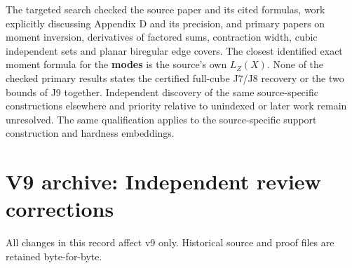 \documentclass[
  11pt,
]{article}
\begin{document}
The targeted search checked the source paper and its cited formulas,
work explicitly discussing Appendix D and its precision, and primary
papers on moment inversion, derivatives of factored sums, contraction
width, cubic independent sets and planar biregular edge covers. The
closest identified exact moment formula for the \textbf{modes} is the
source's own \(L_Z(X)\). None of the checked primary results states the
certified full-cube J7/J8 recovery or the two bounds of J9 together.
Independent discovery of the same source-specific constructions
elsewhere and priority relative to unindexed or later work remain
unresolved. The same qualification applies to the source-specific
support construction and hardness embeddings.

\section{V9 archive: Independent review corrections}\label{v9-section-review-resolutions}

All changes in this record affect v9 only. Historical source and proof
files are retained byte-for-byte.
\end{document}
